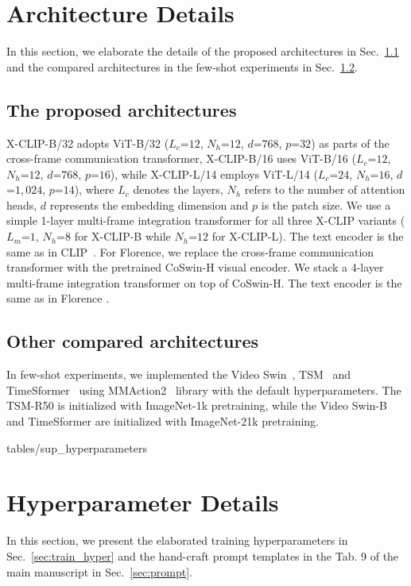 \documentclass[runningheads]{llncs}
\begin{document}
\section{Architecture Details}\label{sec:architecture_detail}
In this section, we elaborate the details of the proposed architectures in Sec.~\ref{sec:our_architecture} and the compared architectures in the few-shot experiments in Sec.~\ref{sec:comparison_method}.
\subsection{The proposed architectures}\label{sec:our_architecture}
X-CLIP-B/32 adopts ViT-B/32  ($L_c$=$12$, $N_h$=$12$, $d$=$768$, $p$=$32$) as parts of the cross-frame communication transformer, X-CLIP-B/16 uses ViT-B/16 ($L_c$=$12$, $N_h$=$12$, $d$=$768$, $p$=$16$), while X-CLIP-L/14 employs ViT-L/14 ($L_c$=$24$, $N_h$=$16$, $d$=$1,024$, $p$=$14$), where $L_c$ denotes the layers, $N_h$ refers to the number of attention heads, $d$ represents the embedding dimension and $p$ is the patch size. We use a simple 1-layer multi-frame integration transformer for all three X-CLIP variants ($L_m$=$1$, $N_h$=$8$ for X-CLIP-B while $N_h$=$12$ for X-CLIP-L). The text encoder is the same as in CLIP~\cite{clip}. For Florence, we replace the cross-frame communication transformer with the pretrained CoSwin-H \cite{florence} visual encoder. We stack a 4-layer multi-frame integration transformer on top of CoSwin-H. The text encoder is the same as in Florence \cite{florence}.
\subsection{Other compared architectures}\label{sec:comparison_method}
In few-shot experiments, we implemented the Video Swin~\cite{liu2021video}, TSM~\cite{lin2019tsm} and TimeSformer~\cite{timesformer2021} using MMAction2~\cite{2020mmaction2} library with the default hyperparameters. The TSM-R50 is initialized with ImageNet-1k pretraining, while the Video Swin-B and TimeSformer are initialized with ImageNet-21k pretraining. 

{tables/sup_hyperparameters}
\section{Hyperparameter Details}\label{sec:hyper}
In this section, we present the elaborated training hyperparameters in Sec.~\ref{sec:train_hyper} and the hand-craft prompt templates in the Tab. 9 of the main manuscript in Sec.~\ref{sec:prompt}.
\end{document}
